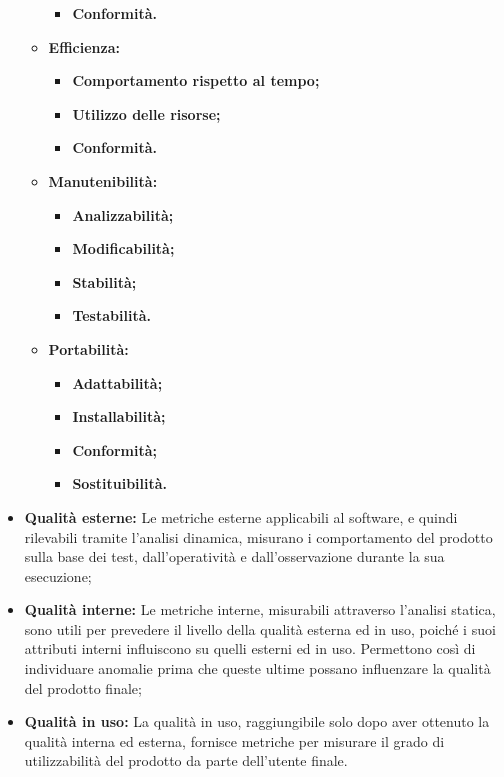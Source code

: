 \begin{itemize}
\begin{itemize}
\begin{itemize}
							\item \textbf{Conformità.}
						\end{itemize}
					\item \textbf{Efficienza:}
						\begin{itemize}
							\item \textbf{Comportamento rispetto al tempo;}
							\item \textbf{Utilizzo delle risorse;}
							\item \textbf{Conformità.}
						\end{itemize}
					\item \textbf{Manutenibilità:}
						\begin{itemize}
							\item \textbf{Analizzabilità;}
							\item \textbf{Modificabilità;}
							\item \textbf{Stabilità;}
							\item \textbf{Testabilità.}
						\end{itemize}
					\item \textbf{Portabilità:}
						\begin{itemize}
							\item \textbf{Adattabilità;}
							\item \textbf{Installabilità;}
							\item \textbf{Conformità;}
							\item \textbf{Sostituibilità.}
						\end{itemize}
				\end{itemize}
			\item \textbf{Qualità esterne: } \textnormal{Le metriche esterne applicabili al software, e quindi rilevabili tramite l'analisi dinamica, misurano i comportamento del prodotto sulla base dei test, dall'operatività e dall'osservazione durante la sua esecuzione;}
			\item \textbf{Qualità interne: } \textnormal{Le metriche interne, misurabili attraverso l'analisi statica, sono utili per prevedere il livello della qualità esterna ed in uso, poiché i suoi attributi interni influiscono su quelli esterni ed in uso. Permettono così di individuare anomalie prima che queste ultime possano influenzare la qualità del prodotto finale;}
			\item \textbf{Qualità in uso: } \textnormal{La qualità in uso, raggiungibile solo dopo aver ottenuto la qualità interna ed esterna, fornisce metriche per misurare il grado di utilizzabilità del prodotto da parte dell'utente finale.}
		\end{itemize}
		
